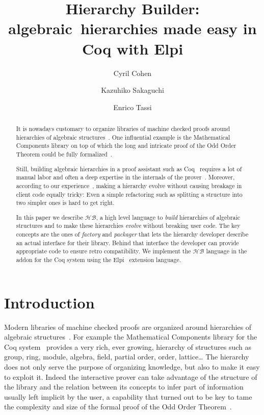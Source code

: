 \documentclass[a4paper,UKenglish,cleveref, autoref]{lipics-v2019}
\title{Hierarchy Builder: algebraic~hierarchies made easy in Coq with Elpi} %
\author{Cyril Cohen}{Inria, France}{Cyril.Cohen@inria.fr}{}{}
\author{Kazuhiko Sakaguchi}{University of Tsukuba, Japan}{sakaguchi@logic.cs.tsukuba.ac.jp}{}{}
\author{Enrico Tassi}{Inria, France}{Enrico.Tassi@inria.fr}{}{}
\newcommand{\HB}{\ensuremath{\mathcal{HB}}}
\newcommand{\hb}{\coq{hierarchy-builder}}
\newcommand{\factory}{factory}
\newcommand{\packager}{packager}
\theoremstyle{implem}
\theoremstyle{implem}
\theoremstyle{command}
\begin{document}
\maketitle

\begin{abstract}
It is nowadays customary to organize libraries of machine checked
proofs around hierarchies of algebraic
structures~\cite{10.1145/3372885.3373824,mathclasses,DBLP:journals/mics/BoldoLM15,DBLP:conf/mpc/AffeldtNS19}.
One influential example is the Mathematical Components library on top
of which the long and intricate proof of the Odd Order
Theorem could be fully formalized~\cite{DBLP:conf/itp/GonthierAABCGRMOBPRSTT13}.

Still, building algebraic hierarchies in a proof assistant such as Coq~\cite{Coq:manual}
requires a lot of manual labor and often a deep expertise in the internals of
the prover~\cite{DBLP:conf/tphol/GarillotGMR09,DBLP:conf/itp/MahboubiT13}.
Moreover, according to our experience~\cite{KSdraft},
making a hierarchy evolve without causing breakage in client code equally tricky:
Even a simple refactoring such as splitting a structure into two simpler ones
is hard to get right.

In this paper we describe \HB{}, a high level language
to \emph{build} hierarchies of algebraic structures and to make these hierarchies
\emph{evolve} without breaking user code. The key concepts are the ones of
\emph{\factory{}} and \emph{\packager{}} that lets the hierarchy developer
describe an actual
interface for their library. Behind that interface the developer can provide
appropriate code to ensure retro compatibility.
We implement the \HB{} language in the \hb{} addon for the Coq
system using the Elpi~\cite{DBLP:conf/lpar/DunchevGCT15,CoqElpi}
extension language.
\end{abstract}

\section{Introduction}

Modern libraries of machine checked proofs are organized around
hierarchies of algebraic structures~\cite{10.1145/3372885.3373824,mathclasses,DBLP:journals/mics/BoldoLM15,DBLP:conf/mpc/AffeldtNS19}.
For example the Mathematical Components library for the Coq system~\cite{Coq:manual}
provides a very rich, ever growing, hierarchy of structures such as
group, ring, module, algebra, field, partial order, order, lattice\ldots
The hierarchy does not only serve the purpose of organizing knowledge, but
also to make it easy to exploit it. Indeed the interactive prover can
take advantage of the structure of the library and the relation between
its concepts to infer part of information usually left implicit
by the user, a capability that turned out to be key to tame
the complexity and size of the formal proof of the Odd Order
Theorem~\cite{DBLP:conf/itp/GonthierAABCGRMOBPRSTT13}.
\end{document}
